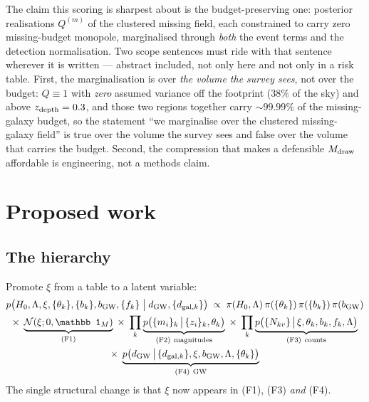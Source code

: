 \documentclass[11pt]{article}
\theoremstyle{definition}
\theoremstyle{remark}
\newcommand{\bgw}{b_{\rm GW}}
\newcommand{\dgw}{d_{\rm GW}}
\newcommand{\zdep}{z_{\rm depth}}
\newcommand{\Mdraw}{M_{\rm draw}}
\begin{document}
\noindent The claim this scoring is sharpest about is the budget-preserving one:
posterior realisations $Q^{(m)}$ of the clustered missing field, each constrained
to carry zero missing-budget monopole, marginalised through \emph{both} the event
terms and the detection normalisation. Two scope sentences must ride with that
sentence wherever it is written --- abstract included, not only here and not only
in a risk table. First, the marginalisation is over \emph{the volume the survey
sees}, not over the budget: $Q\equiv1$ with \emph{zero} assumed variance off the
footprint ($38\%$ of the sky) and above $\zdep=0.3$, and those two regions
together carry $\sim99.99\%$ of the missing-galaxy budget, so the statement ``we
marginalise over the clustered missing-galaxy field'' is true over the volume the
survey sees and false over the volume that carries the budget. Second, the
compression that makes a defensible $\Mdraw$ affordable is engineering, not a
methods claim.

\section{Proposed work}
\label{sec:proposed}

\subsection{The hierarchy}

Promote $\xi$ from a table to a latent variable:
\begin{multline}
  p\big(H_0,\Lambda,\xi,\{\theta_k\},\{b_k\},\bgw,\{f_k\}\;\big|\;\dgw,\{d_{{\rm gal},k}\}\big)
  \;\propto\;
  \pi(H_0,\Lambda)\,\pi(\{\theta_k\})\,\pi(\{b_k\})\,\pi(\bgw)\\
  \times\;\underbrace{\mathcal N(\xi;0,\mathbb 1_M)}_{\rm (F1)}\;
  \times\;\prod_{k}\underbrace{p\big(\{m_i\}_k\,\big|\,\{z_i\}_k,\theta_k\big)}_{\rm (F2)\ magnitudes}\;
  \times\;\prod_{k}\underbrace{p\big(\{N_{kv}\}\,\big|\,\xi,\theta_k,b_k,f_k,\Lambda\big)}_{\rm (F3)\ counts}\\
  \times\;\underbrace{p\big(\dgw\,\big|\,\{d_{{\rm gal},k}\},\xi,\bgw,\Lambda,\{\theta_k\}\big)}_{\rm (F4)\ GW}
  \label{eq:hierarchy}
\end{multline}
The single structural change is that $\xi$ now appears in (F1), (F3) \emph{and}
(F4).
\end{document}
